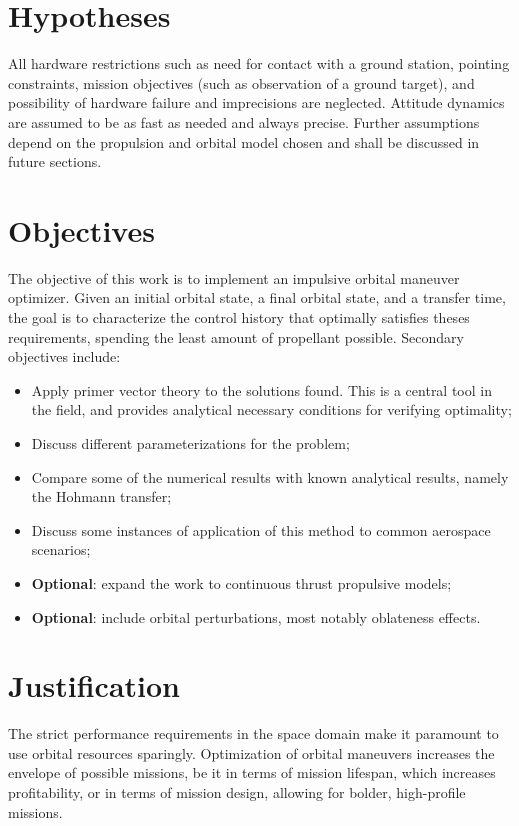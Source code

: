 \section{Hypotheses}




All hardware restrictions such as need for contact with a ground station, pointing constraints, mission objectives (such as observation of a ground target), and possibility of hardware failure and imprecisions are neglected. Attitude dynamics are assumed to be as fast as needed and always precise. Further assumptions depend on the propulsion and orbital model chosen and shall be discussed in future sections.

\section{Objectives}

The objective of this work is to implement an impulsive orbital maneuver optimizer. Given an initial orbital state, a final orbital state, and a transfer time, the goal is to characterize the control history that optimally satisfies theses requirements, spending the least amount of propellant possible. Secondary objectives include:
\begin{itemize}
    \item Apply primer vector theory to the solutions found. This is a central tool in the field, and provides analytical necessary conditions for verifying optimality;
    \item Discuss different parameterizations for the problem;
    \item Compare some of the numerical results with known analytical results, namely the Hohmann transfer;
    \item Discuss some instances of application of this method to common aerospace scenarios;
    \item \textbf{Optional}: expand the work to continuous thrust propulsive models;
    \item \textbf{Optional}: include orbital perturbations, most notably oblateness effects.
\end{itemize}

\section{Justification}

The strict performance requirements in the space domain make it paramount to use orbital resources sparingly. Optimization of orbital maneuvers increases the envelope of possible missions, be it in terms of mission lifespan, which increases profitability, or in terms of mission design, allowing for bolder, high-profile missions. 

